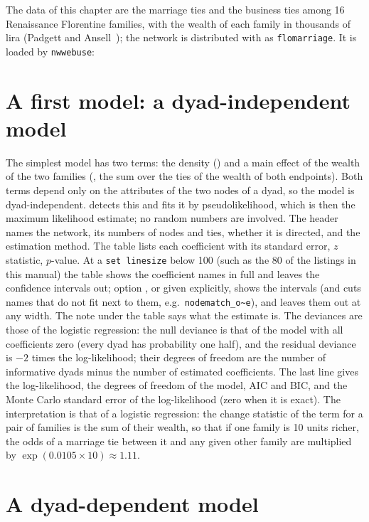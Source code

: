 The data of this chapter are the marriage ties and the business ties among 16 Renaissance Florentine families, with the wealth of each family in thousands of lira (Padgett and Ansell~\cite{padgett1993}); the network is distributed with \ergm{} as \texttt{flomarriage}. It is loaded by \texttt{nwwebuse}:

\section{A first model: a dyad-independent model}\label{sec:firstmodel}

The simplest model has two terms: the density () and a main effect of the wealth of the two families (, the sum over the ties of the wealth of both endpoints). Both terms depend only on the attributes of the two nodes of a dyad, so the model is dyad-independent. \nwergm{} detects this and fits it by pseudolikelihood, which is then the maximum likelihood estimate; no random numbers are involved.
The header names the network, its numbers of nodes and ties, whether it is directed, and the estimation method. The table lists each coefficient with its standard error, $z$ statistic, $p$-value. At a \texttt{set linesize} below 100 (such as the 80 of the listings in this manual) the table shows the coefficient names in full and leaves the confidence intervals out; option , or  given explicitly, shows the intervals (and cuts names that do not fit next to them, e.g.\ \texttt{nodematch\_o\~{}e}), and  leaves them out at any width. The note under the table says what the estimate is. The deviances are those of the logistic regression: the null deviance is that of the model with all coefficients zero (every dyad has probability one half), and the residual deviance is $-2$ times the log-likelihood; their degrees of freedom are the number of informative dyads minus the number of estimated coefficients. The last line gives the log-likelihood, the degrees of freedom of the model, AIC and BIC, and the Monte Carlo standard error of the log-likelihood (zero when it is exact). The interpretation is that of a logistic regression: the change statistic of the term for a pair of families is the sum of their wealth, so that if one family is 10 units richer, the odds of a marriage tie between it and any given other family are multiplied by $\exp(0.0105\times10)\approx1.11$.

\section{A dyad-dependent model}\label{sec:secondmodel}

